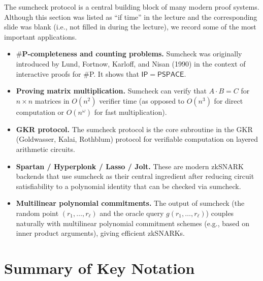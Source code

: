 \documentclass[11pt]{article}
\begin{document}
The sumcheck protocol is a central building block of many modern proof systems. Although this
section was listed as ``if time'' in the lecture and the corresponding slide was blank (i.e., not
filled in during the lecture), we record some of the most important applications.

\begin{itemize}
  \item \textbf{$\#$P-completeness and counting problems.} Sumcheck was originally introduced by
        Lund, Fortnow, Karloff, and Nisan (1990) in the context of interactive proofs for $\#$P.
        It shows that $\mathsf{IP} = \mathsf{PSPACE}$.

  \item \textbf{Proving matrix multiplication.} Sumcheck can verify that $A \cdot B = C$ for
        $n \times n$ matrices in $O(n^2)$ verifier time (as opposed to $O(n^3)$ for direct
        computation or $O(n^\omega)$ for fast multiplication).

  \item \textbf{GKR protocol.} The sumcheck protocol is the core subroutine in the GKR (Goldwasser,
        Kalai, Rothblum) protocol for verifiable computation on layered arithmetic circuits.

  \item \textbf{Spartan / Hyperplonk / Lasso / Jolt.} These are modern zkSNARK backends that use
        sumcheck as their central ingredient after reducing circuit satisfiability to a polynomial
        identity that can be checked via sumcheck.

  \item \textbf{Multilinear polynomial commitments.} The output of sumcheck (the random point
        $(r_1, \ldots, r_\ell)$ and the oracle query $g(r_1, \ldots, r_\ell)$) couples naturally
        with multilinear polynomial commitment schemes (e.g., based on inner product arguments),
        giving efficient zkSNARKs.
\end{itemize}

\appendix
\section*{Summary of Key Notation}
\end{document}
